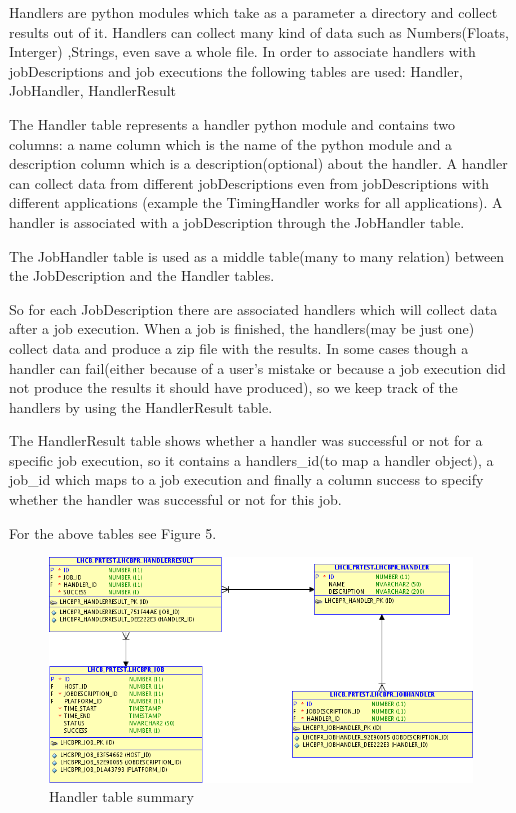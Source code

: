 \documentclass{lhcbnote}
\begin{document}
Handlers are python modules which take as a parameter a directory and 
collect results out of it. Handlers can collect many kind of data
such as Numbers(Floats, Interger) ,Strings, even save a whole file. In order 
to associate handlers with jobDescriptions and job executions the following tables
are used: Handler, JobHandler, HandlerResult

\vspace{4 mm}

The Handler table represents a handler python module and contains two columns:
a name column which is the name of the python module and a description column 
which is a description(optional) about the handler. A handler can collect data from 
different jobDescriptions even from jobDescriptions with different applications
(example the TimingHandler works for all applications). A handler is associated with 
a jobDescription through the JobHandler table.

\vspace{4 mm}

The JobHandler table is used as a middle table(many to many relation) 
between the JobDescription and the  Handler tables.

\vspace{4 mm}

So for each JobDescription there are associated handlers which will collect data after a job 
execution. When a job is finished, the handlers(may be just one) collect data and produce a zip 
file with the results. In some cases though a handler can fail(either because of a user's mistake or because 
a job execution did not produce the results it should have produced), so we keep track of the handlers 
by using the HandlerResult table.

The HandlerResult table shows whether a handler was successful or not for a specific job execution, so
it contains a handlers\_id(to map a handler object), a job\_id which maps to a job execution and 
finally a column success to specify whether the handler was successful or not for this job.

\vspace{4 mm}

For the above tables see Figure 5.


\begin{figure}[ht!]
\centering
\includegraphics[width=170mm]{handler.png}
\caption{Handler table summary}
\label{overflow}
\end{figure}
\end{document}
